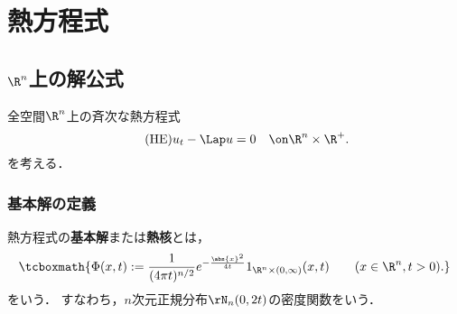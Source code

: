 \documentclass[uplatex,dvipdfmx]{jsreport}
\begin{document}
\chapter{熱方程式}

\section{$\R^n$上の解公式}

全空間$\R^n$上の斉次な熱方程式
\begin{equation}\label{HE}\tag{HE}
    u_t-\Lap u=0\quad\on\R^n\times\R^+.
\end{equation}
を考える．

\subsection{基本解の定義}

\begin{tcolorbox}[colframe=ForestGreen, colback=ForestGreen!10!white,breakable,colbacktitle=ForestGreen!40!white,coltitle=black,fonttitle=\bfseries\sffamily,
title=]
    \begin{definition}
        熱方程式の\textbf{基本解}または\textbf{熱核}とは，
        \[\tcboxmath{\Phi(x,t):=\frac{1}{(4\pi t)^{n/2}}e^{-\frac{\abs{x}^2}{4t}}1_{\R^n\times(0,\infty)}(x,t)\qquad(x\in\R^n,t>0).}\]
        をいう．
        すなわち，$n$次元正規分布$\rN_n(0,2t)$の密度関数をいう．
    \end{definition}
\end{tcolorbox}
\end{document}
